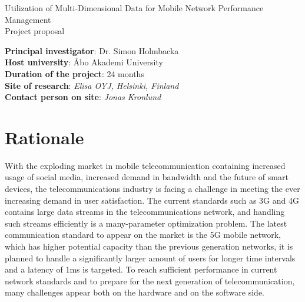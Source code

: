 \documentclass{article}
\begin{document}
\huge{Utilization of Multi-Dimensional Data for Mobile Network Performance Management\\\large{Project proposal}}

\begin{table}[h]

\normalsize\textbf{Principal investigator}: Dr. Simon Holmbacka\\
\textbf{Host university}: \AA{}bo Akademi University\\
\textbf{Duration of the project}: 24 months\\
\textbf{Site of research}:\textit{ Elisa OYJ, Helsinki, Finland}\\
\textbf{Contact person on site}: \textit{Jonas Kronlund}

\end{table}

\date{\today} %

\normalsize
\section{Rationale}
\label{sec:rationale}
With the exploding market in mobile telecommunication containing increased usage of social media, increased demand in bandwidth and the future of smart devices, the telecommunications industry is facing a challenge in meeting the ever increasing demand in user satisfaction.
The current standards such as 3G and 4G contains large data streams in the telecommunications network, and handling such streams efficiently is a many-parameter optimization problem.
The latest communication standard to appear on the market is the 5G mobile network, which has higher potential capacity than the previous generation networks, it is planned to handle a significantly larger amount of users for longer time intervals and a latency of 1ms is targeted.
To reach sufficient performance in current network standards and to prepare for the next generation of telecommunication, many challenges appear both on the hardware and on the software side.\vspace{0.2cm}
\end{document}
